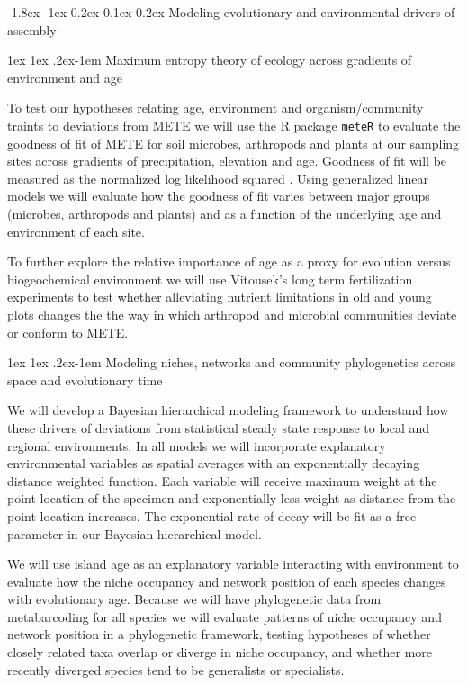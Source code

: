 \documentclass[11pt]{article}
\makeatletter
\renewcommand\subsubsection{\@startsection{subsection}{1}{\z@}%
                                  {-1.8ex \@plus -1ex \@minus 0.2ex}%
                                  {0.1ex \@plus 0.2ex}%
                                  {\normalfont\bfseries}}
\renewcommand{\paragraph}{\@startsection{paragraph}{4}{\z@}
  {1ex \@plus 1ex \@minus .2ex}{-1em}
  {\normalfont\normalsize\it}
}
\makeatother
\begin{document}
\subsubsection{Modeling evolutionary and environmental drivers of
  assembly}


\paragraph{Maximum entropy theory of ecology across gradients of
  environment and age}

To test our hypotheses relating age, environment and
organism/community traints to deviations from METE we will use the R
package {\tt meteR} \citep[developed by Rominger][]{rominger2016} to
evaluate the goodness of fit of METE for soil microbes, arthropods and
plants at our sampling sites across gradients of precipitation,
elevation and age.  Goodness of fit will be measured as the normalized
log likelihood squared \citep[described in][]{rominger2016}. Using
generalized linear models we will evaluate how the goodness of fit
varies between major groups (microbes, arthropods and plants) and as a
function of the underlying age and environment of each site.

To further explore the relative importance of age as a proxy for
evolution versus biogeochemical environment we will use Vitousek’s
long term fertilization experiments to test whether alleviating
nutrient limitations in old and young plots changes the the way in
which arthropod and microbial communities deviate or conform to METE.


\paragraph{Modeling niches, networks and community phylogenetics
  across space and evolutionary time}

We will develop a Bayesian hierarchical modeling framework to
understand how these drivers of deviations from statistical steady
state response to local and regional environments.  In all models we
will incorporate explanatory environmental variables as spatial
averages with an exponentially decaying distance weighted function.
Each variable will receive maximum weight at the point location of the
specimen and exponentially less weight as distance from the point
location increases.  The exponential rate of decay will be fit as a
free parameter in our Bayesian hierarchical model.

We will use island age as an explanatory variable interacting with
environment to evaluate how the niche occupancy and network position
of each species changes with evolutionary age.  Because we will have
phylogenetic data from metabarcoding for all species we will evaluate
patterns of niche occupancy and network position in a phylogenetic
framework, testing hypotheses of whether closely related taxa overlap
or diverge in niche occupancy, and whether more recently diverged
species tend to be generalists or specialists.
\end{document}
